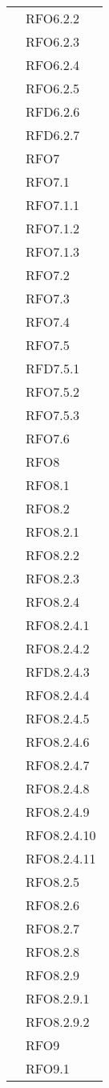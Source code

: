 \begin{longtable}{ p{12cm} | p{4cm} }
			& RFO6.2.2 \\
			& RFO6.2.3 \\
			& RFO6.2.4 \\
			& RFO6.2.5 \\
			& RFD6.2.6 \\
			& RFD6.2.7 \\
			& RFO7 \\
			& RFO7.1 \\
			& RFO7.1.1 \\
			& RFO7.1.2 \\
			& RFO7.1.3 \\
			& RFO7.2 \\
			& RFO7.3 \\
			& RFO7.4 \\
			& RFO7.5 \\
			& RFD7.5.1 \\
			& RFO7.5.2 \\
			& RFO7.5.3 \\
			& RFO7.6 \\
			& RFO8 \\
			& RFO8.1 \\
			& RFO8.2 \\
			& RFO8.2.1 \\
			& RFO8.2.2 \\
			& RFO8.2.3 \\
			& RFO8.2.4 \\
			& RFO8.2.4.1 \\
			& RFO8.2.4.2 \\
			& RFD8.2.4.3 \\
			& RFO8.2.4.4 \\
			& RFO8.2.4.5 \\
			& RFO8.2.4.6 \\
			& RFO8.2.4.7 \\
			& RFO8.2.4.8 \\
			& RFO8.2.4.9 \\
			& RFO8.2.4.10 \\
			& RFO8.2.4.11 \\
			& RFO8.2.5 \\
			& RFO8.2.6 \\
			& RFO8.2.7 \\
			& RFO8.2.8 \\
			& RFO8.2.9 \\
			& RFO8.2.9.1 \\
			& RFO8.2.9.2 \\
			& RFO9 \\
			& RFO9.1 \\

\end{longtable}
